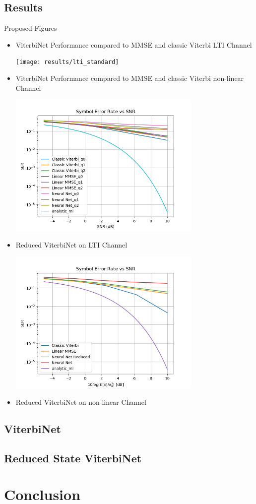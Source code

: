 \documentclass[12pt,a4paper]{report}
\begin{document}
\subsection{Results}
Proposed Figures
\begin{itemize}
\item ViterbiNet Performance compared to MMSE and classic Viterbi LTI Channel

	\texttt{[image: results/lti\_standard]}

\item ViterbiNet Performance compared to MMSE and classic Viterbi non-linear Channel

	\includegraphics[width=\textwidth,height = 7cm]{results/quant_standard}

\item Reduced ViterbiNet on LTI Channel

	\includegraphics[width=\textwidth,height = 7cm]{results/lti_reduced}

\item Reduced ViterbiNet on non-linear Channel

\end{itemize}
\subsection*{ViterbiNet}
\subsection*{Reduced State ViterbiNet}
\section{Conclusion}

\newpage

\end{document}
